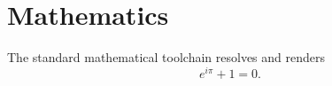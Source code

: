 \section{Mathematics}\label{sec:math}
The standard mathematical toolchain resolves and renders
\begin{equation}\label{eq:identity}
  e^{i\pi}+1=0.
\end{equation}
